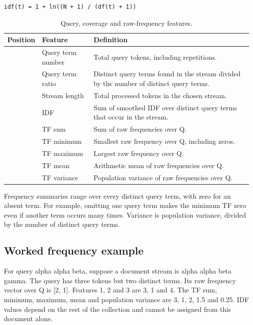 \documentclass[12pt,a4paper]{article}
\begin{document}
\begin{small}\begin{verbatim}
idf(t) = 1 + ln((N + 1) / (df(t) + 1))
\end{verbatim}\end{small}
\begin{table}[htbp]\centering\small
\caption{Query, coverage and raw-frequency features.}
\begin{tabularx}{\linewidth}{>{\raggedright\arraybackslash}X>{\raggedright\arraybackslash}X>{\raggedright\arraybackslash}X}
\toprule
\textbf{Position} & \textbf{Feature} & \textbf{Definition} \\\midrule
1 & Query term number & Total query tokens, including repetitions. \\
2 & Query term ratio & Distinct query terms found in the stream divided by the number of distinct query terms. \\
3 & Stream length & Total processed tokens in the chosen stream. \\
4 & IDF & Sum of smoothed IDF over distinct query terms that occur in the stream. \\
5 & TF sum & Sum of raw frequencies over Q. \\
6 & TF minimum & Smallest raw frequency over Q, including zeros. \\
7 & TF maximum & Largest raw frequency over Q. \\
8 & TF mean & Arithmetic mean of raw frequencies over Q. \\
9 & TF variance & Population variance of raw frequencies over Q. \\
\bottomrule\end{tabularx}\end{table}
Frequency summaries range over every distinct query term, with zero for an absent term. For example, omitting one query term makes the minimum TF zero even if another term occurs many times. Variance is population variance, divided by the number of distinct query terms.

\subsection{Worked frequency example}
For query alpha alpha beta, suppose a document stream is alpha alpha beta gamma. The query has three tokens but two distinct terms. Its raw frequency vector over Q is [2, 1]. Features 1, 2 and 3 are 3, 1 and 4. The TF sum, minimum, maximum, mean and population variance are 3, 1, 2, 1.5 and 0.25. IDF values depend on the rest of the collection and cannot be assigned from this document alone.
\end{document}
